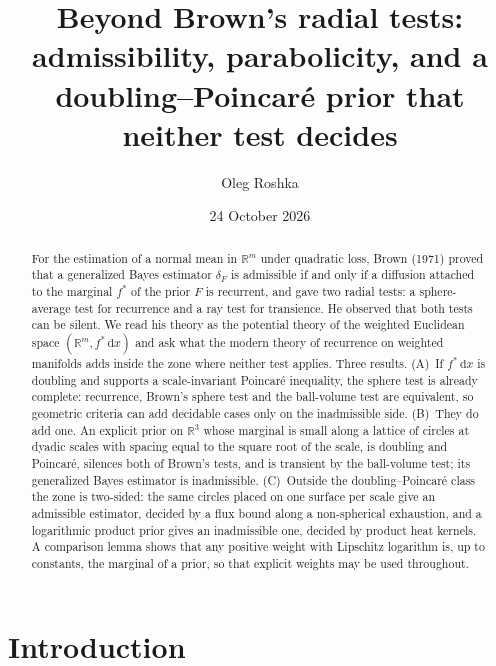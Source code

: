 \documentclass[11pt]{amsart}
\title[Beyond Brown's radial tests]{Beyond Brown's radial tests:\\ admissibility, parabolicity, and a doubling--Poincar\'e prior that neither test decides}
\author{Oleg Roshka}
\date{24 October 2026}
\newcommand{\R}{\mathbb{R}}
\newcommand{\dd}{\,\mathrm{d}}
\theoremstyle{plain}
\theoremstyle{definition}
\theoremstyle{remark}
\begin{document}
\begin{abstract}
For the estimation of a normal mean in $\R^m$ under quadratic loss, Brown (1971)
proved that a generalized Bayes estimator $\delta_F$ is admissible if and only if
a diffusion attached to the marginal $f^*$ of the prior $F$ is recurrent, and
gave two radial tests: a sphere-average test for recurrence and a ray test for
transience. He observed that both tests can be silent. We read his theory as the
potential theory of the weighted Euclidean space $(\R^m,f^*\dd x)$ and ask what
the modern theory of recurrence on weighted manifolds adds inside the zone where
neither test applies. Three results. (A)~If $f^*\dd x$ is doubling and supports a
scale-invariant Poincar\'e inequality, the sphere test is already complete:
recurrence, Brown's sphere test and the ball-volume test are equivalent, so
geometric criteria can add decidable cases only on the inadmissible side.
(B)~They do add one. An explicit prior on $\R^3$ whose marginal is small along a
lattice of circles at dyadic scales with spacing equal to the square root of the scale, is
doubling and Poincar\'e, silences both of Brown's tests, and is transient by the
ball-volume test; its generalized Bayes estimator is inadmissible. (C)~Outside
the doubling--Poincar\'e class the zone is two-sided: the same circles placed on
one surface per scale give an admissible estimator, decided by a flux bound along
a non-spherical exhaustion, and a logarithmic product prior gives an inadmissible
one, decided by product heat kernels. A comparison lemma shows that any positive
weight with Lipschitz logarithm is, up to constants, the marginal of a prior, so
that explicit weights may be used throughout.
\end{abstract}

\maketitle

\section{Introduction}\label{sec:intro}
\end{document}
